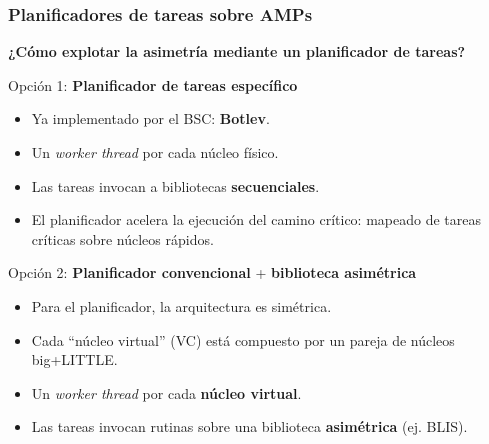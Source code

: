 \documentclass[10pt]{beamer}
\begin{document}
\begin{frame}
  \frametitle{Planificadores de tareas sobre AMPs}
  {\bf ¿Cómo explotar la asimetría mediante un planificador de tareas?}

  \begin{block}{Opción 1: {\bf Planificador de tareas específico}}
    \begin{itemize}
      \footnotesize
    \item Ya implementado por el BSC: {\bf Botlev}.
    \item Un {\em worker thread} por cada núcleo físico.
    \item Las tareas invocan a bibliotecas {\bf secuenciales}.
    \item El planificador acelera la ejecución del camino crítico:
      mapeado de tareas críticas sobre núcleos rápidos.
    \end{itemize}
  \end{block}

  \begin{alertblock}{Opción 2: {\bf Planificador convencional} + {\bf biblioteca asimétrica}}
    \begin{itemize}
      \footnotesize
    \item Para el planificador, la arquitectura es simétrica.
    \item Cada ``núcleo virtual'' (VC) está compuesto por un pareja de
      núcleos big+LITTLE.
    \item Un {\em worker thread} por cada {\bf núcleo virtual}.
    \item Las tareas invocan rutinas sobre una biblioteca {\bf
        asimétrica} (ej. BLIS).
    \end{itemize}
  \end{alertblock}
\end{frame}
\end{document}
